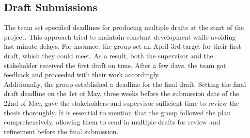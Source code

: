 \subsection{Draft Submissions}
The team set specified deadlines for producing multiple drafts at the start of the project. This approach tried to maintain constant development while avoiding last-minute delays. For instance, the group set an April 3rd target for their first draft, which they could meet. As a result, both the supervisor and the stakeholder received the first draft on time. After a few days, the team got feedback and proceeded with their work accordingly. 
\\
Additionally, the group established a deadline for the final draft. Setting the final draft deadline on the 1st of May, three weeks before the submission date of the 22nd of May, gave the stakeholders and supervisor sufficient time to review the thesis thoroughly. It is essential to mention that the group followed the plan comprehensively, allowing them to send in multiple drafts for review and refinement before the final submission. 


